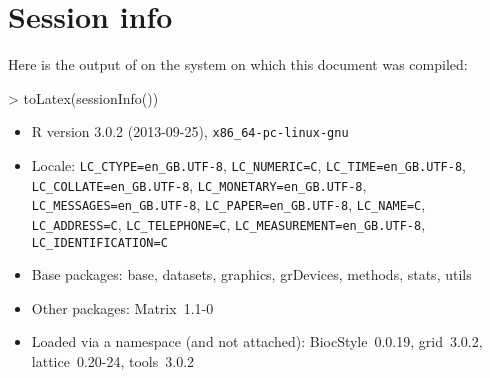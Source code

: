 \documentclass{article}
\begin{document}
\section{Session info}
Here is the output of  on the system on which
this document was compiled:
\begin{Schunk}
\begin{Sinput}
> toLatex(sessionInfo())
\end{Sinput}
\begin{itemize}\raggedright
  \item R version 3.0.2 (2013-09-25), \verb|x86_64-pc-linux-gnu|
  \item Locale: \verb|LC_CTYPE=en_GB.UTF-8|, \verb|LC_NUMERIC=C|, \verb|LC_TIME=en_GB.UTF-8|, \verb|LC_COLLATE=en_GB.UTF-8|, \verb|LC_MONETARY=en_GB.UTF-8|, \verb|LC_MESSAGES=en_GB.UTF-8|, \verb|LC_PAPER=en_GB.UTF-8|, \verb|LC_NAME=C|, \verb|LC_ADDRESS=C|, \verb|LC_TELEPHONE=C|, \verb|LC_MEASUREMENT=en_GB.UTF-8|, \verb|LC_IDENTIFICATION=C|
  \item Base packages: base, datasets, graphics, grDevices, methods, stats,
    utils
  \item Other packages: Matrix~1.1-0
  \item Loaded via a namespace (and not attached): BiocStyle~0.0.19, grid~3.0.2,
    lattice~0.20-24, tools~3.0.2
\end{itemize}\end{Schunk}


%
%



\end{document}
